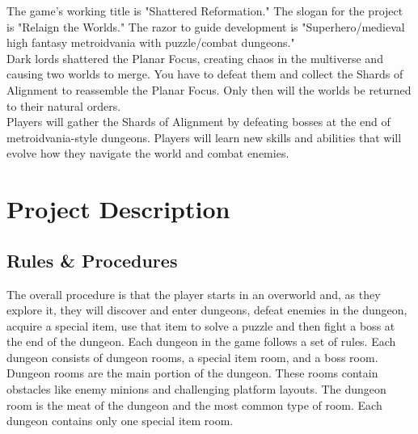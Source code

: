 \documentclass[titlepage]{article}
\begin{document}
%

The game's working title is "Shattered Reformation." The slogan for the project
is "Relaign the Worlds." The razor to guide development is "Superhero/medieval
high fantasy metroidvania with puzzle/combat dungeons." \\

Dark lords shattered the Planar Focus, creating chaos in the multiverse and
causing two worlds to merge. You have to defeat them and collect the Shards of
Alignment to reassemble the Planar Focus. Only then will the worlds be returned
to their natural orders. \\

Players will gather the Shards of Alignment by defeating bosses at the end of
metroidvania-style dungeons. Players will learn new skills and abilities that
will evolve how they navigate the world and combat enemies. 

\section{Project Description}

\subsection{Rules \& Procedures}

The overall procedure is that the player starts in an overworld and, as they explore 
it, they will discover and enter dungeons, defeat enemies in the dungeon, acquire a 
special item, use that item to solve a puzzle and then fight a boss at the end of the 
dungeon. Each dungeon in the game follows a set of rules. Each dungeon consists of 
dungeon rooms, a special item room, and a boss room. Dungeon rooms are the main 
portion of the dungeon. These rooms contain obstacles like enemy minions and challenging 
platform layouts. The dungeon room is the meat of the dungeon and the most common 
type of room. Each dungeon contains only one special item room. 
\end{document}
